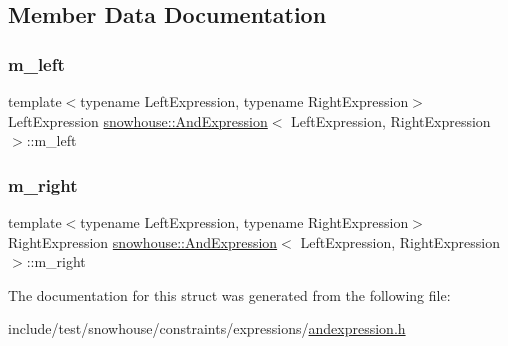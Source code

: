 \subsection{Member Data Documentation}
\mbox{\label{structsnowhouse_1_1AndExpression_a4ae9b17cc0abac75463b2b8308ed93b2}} 
\subsubsection{\texorpdfstring{m\_left}{m\_left}}
{\footnotesize\ttfamily template$<$typename Left\+Expression, typename Right\+Expression$>$ \\
Left\+Expression \mbox{\hyperlink{structsnowhouse_1_1AndExpression}{snowhouse\+::\+And\+Expression}}$<$ Left\+Expression, Right\+Expression $>$\+::m\+\_\+left}

\mbox{\label{structsnowhouse_1_1AndExpression_ae3d3890df4b6d0b8648ddc8e1f15e857}} 
\subsubsection{\texorpdfstring{m\_right}{m\_right}}
{\footnotesize\ttfamily template$<$typename Left\+Expression, typename Right\+Expression$>$ \\
Right\+Expression \mbox{\hyperlink{structsnowhouse_1_1AndExpression}{snowhouse\+::\+And\+Expression}}$<$ Left\+Expression, Right\+Expression $>$\+::m\+\_\+right}



The documentation for this struct was generated from the following file\+:\begin{DoxyCompactItemize}
\item 
include/test/snowhouse/constraints/expressions/\mbox{\hyperlink{andexpression_8h}{andexpression.\+h}}\end{DoxyCompactItemize}
